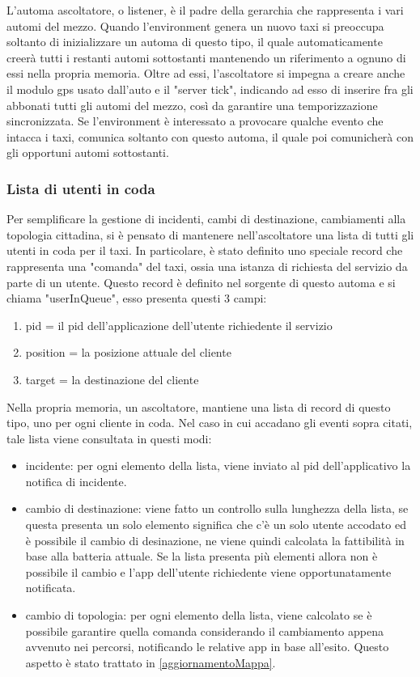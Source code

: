 L'automa ascoltatore, o listener, è il padre della gerarchia che rappresenta i vari automi del mezzo. Quando l'environment genera un nuovo taxi si preoccupa soltanto di inizializzare un automa di questo tipo, il quale automaticamente creerà tutti i restanti automi sottostanti mantenendo un riferimento a ognuno di essi nella propria memoria. Oltre ad essi, l'ascoltatore si impegna a creare anche il modulo gps usato dall'auto e il "server tick", indicando ad esso di inserire fra gli abbonati tutti gli automi del mezzo, così da garantire una temporizzazione sincronizzata. Se l'environment è interessato a provocare qualche evento che intacca i taxi, comunica soltanto con questo automa, il quale poi comunicherà con gli opportuni automi sottostanti.

\subsubsection{Lista di utenti in coda} \label{usersInQueue}

Per semplificare la gestione di incidenti, cambi di destinazione, cambiamenti alla topologia cittadina, si è pensato di mantenere nell'ascoltatore una lista di tutti gli utenti in coda per il taxi. In particolare, è stato definito uno speciale record che rappresenta una "comanda" del taxi, ossia una istanza di richiesta del servizio da parte di un utente.
Questo record è definito nel sorgente di questo automa e si chiama "userInQueue", esso presenta questi 3 campi:

\begin{enumerate}
	\item pid = il pid dell'applicazione dell'utente richiedente il servizio
	\item position = la posizione attuale del cliente 
	\item target = la destinazione del cliente
\end{enumerate}

Nella propria memoria, un ascoltatore, mantiene una lista di record di questo tipo, uno per ogni cliente in coda.
Nel caso in cui accadano gli eventi sopra citati, tale lista viene consultata in questi modi:
\begin{itemize}
	\item incidente: per ogni elemento della lista, viene inviato al pid dell'applicativo la notifica di incidente.
	\item cambio di destinazione: viene fatto un controllo sulla lunghezza della lista, se questa presenta un solo elemento significa che c'è un solo utente accodato ed è possibile il cambio di desinazione, ne viene quindi calcolata la fattibilità in base alla batteria attuale. Se la lista presenta più elementi allora non è possibile il cambio e l'app dell'utente richiedente viene opportunatamente notificata.
	\item cambio di topologia: per ogni elemento della lista, viene calcolato se è possibile garantire quella comanda considerando il cambiamento appena avvenuto nei percorsi, notificando le relative app in base all'esito. Questo aspetto è stato trattato in \ref{aggiornamentoMappa}.
\end{itemize}

